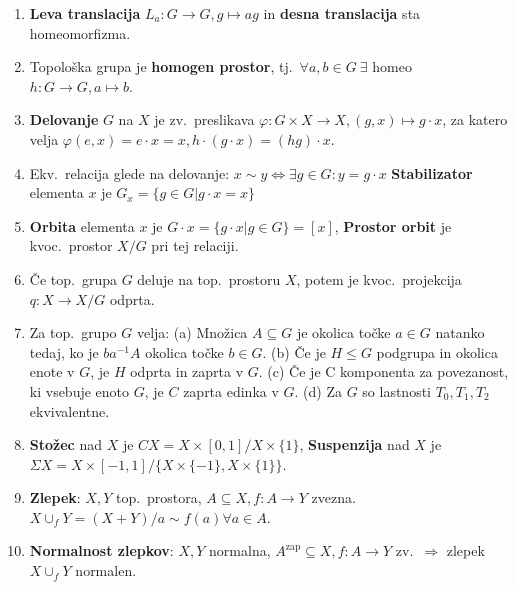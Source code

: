\documentclass[10pt,a4paper]{article}
\begin{document}
\begin{enumerate}
\item \textbf{Leva translacija} $L_a : G \rightarrow G, g \mapsto ag$ in
    \textbf{desna translacija} sta homeomorfizma.
    
\item Topološka grupa je \textbf{homogen prostor}, tj.~$\forall a, b \in G \
    \exists$ homeo $h: G \rightarrow G, a \mapsto b$.
    
\item \textbf{Delovanje} $G$ na $X$ je zv.~preslikava $\varphi: G \times X
    \rightarrow X, (g, x) \mapsto g \cdot x$, za katero velja $\varphi(e, x) =
    e \cdot x = x, h \cdot (g \cdot x) = (hg) \cdot x$.
    
\item Ekv.~relacija glede na delovanje: $x \sim y \Leftrightarrow \exists g \in G:
    y = g \cdot x$
    \textbf{Stabilizator} elementa $x$ je $G_x = \{g \in G | g \cdot x = x\}$

    
\item \textbf{Orbita} elementa $x$ je $G \cdot x = \{g \cdot x | g \in G\} = [x]$, \textbf{Prostor orbit} je kvoc.~prostor $X/G$ pri tej relaciji.
    
    
\item Če top.~grupa $G$ deluje na top.~prostoru $X$, potem je kvoc.~projekcija
    $q: X \rightarrow X/G$ odprta.
    
\item Za top.~grupo $G$ velja: (a) Množica $A \subseteq G$ je okolica točke
    $a \in G$ natanko tedaj, ko je $ba^{-1}A$ okolica točke $b \in G$.
    (b) Če je $H \leq G$ podgrupa in okolica enote v $G$, je $H$ odprta in zaprta v $G$.
    (c) Če je C komponenta za povezanost, ki vsebuje enoto $G$, je $C$ zaprta edinka v $G$.
    (d) Za $G$ so lastnosti $T_0, T_1, T_2$ ekvivalentne.
    
\item \textbf{Stožec} nad $X$ je $CX = X \times [0, 1]/X \times \{1\}$, \textbf{Suspenzija} nad $X$ je $\Sigma  X = X \times [-1, 1]/
    \{X \times \{-1\}, X \times \{1\}\}$.
    
\item \textbf{Zlepek}: $X, Y$ top.~prostora, $A \subseteq X, f: A \rightarrow Y$
    zvezna.~$X \cup_f Y = (X + Y)/a \sim f(a) \forall a \in A$.
    
\item \textbf{Normalnost zlepkov}: $X, Y$ normalna, $A^{\text{zap}} \subseteq X, f:
    A \rightarrow Y$ zv.~$\Rightarrow$ zlepek $X \cup_f Y$ normalen.
    

\end{enumerate}
\end{document}
